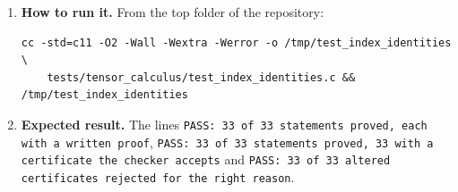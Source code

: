 \documentclass[11pt,a4paper]{article}
\begin{document}
\begin{enumerate}
\item \textbf{How to run it.} From the top folder of the repository:
\begin{verbatim}
cc -std=c11 -O2 -Wall -Wextra -Werror -o /tmp/test_index_identities \
    tests/tensor_calculus/test_index_identities.c && /tmp/test_index_identities
\end{verbatim}

\item \textbf{Expected result.} The lines \texttt{PASS: 33 of 33 statements proved, each with a written proof}, \texttt{PASS: 33 of 33 statements proved, 33 with a certificate the checker accepts} and \texttt{PASS: 33 of 33 altered certificates rejected for the right reason}.

\end{enumerate}
\end{document}
